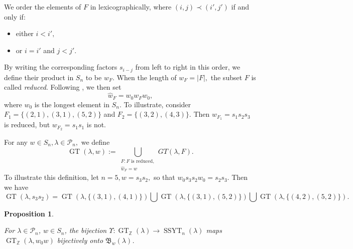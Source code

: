 \documentclass[11pt,reqno]{amsart}
\newcommand\Par{\mathscr{P}}
\newtheorem{proposition}{Proposition}
\DeclareMathOperator{\SSYT}{SSYT}
\DeclareMathOperator{\GT}{GT}
\begin{document}
We order the elements of $F$ in lexicographically, where $(i, j) \prec (i', j')$ if and only if:
\begin{itemize}
    \item either $i < i',$
    \item or $i = i'$ and $j < j'$.
\end{itemize}
By writing the corresponding factors $s_{i-j}$ from left to right in this order, we define their product in $S_n$ to be $w_F$. When the length of $w_F = |F|,$ the subset $F$ is called {\em reduced}. Following \cite[Definition 5.1]{Fujita}, we then set
$$\hat{w}_F=w_0w_Fw_0,$$ where $w_0$ is the longest element in $S_n$. To illustrate, consider $F_1=\{ (2,1),(3,1),(5,2) \}$ and $F_2=\{(3,2),(4,3)\}$. Then $w_{F_1}=s_1s_2s_3$ is reduced, but $w_{F_2} = s_1s_1$ is not. 

For any $w \in S_n, \lambda \in \Par_n,$ we define
$$\GT(\lambda,w):= \bigcup_{ \substack{F: F \text{ is reduced},\\ \hat{w}_F=w} } GT(\lambda,F).$$
To illustrate this definition, let $n=5, w=s_3s_2,$ so that $w_0s_3s_2w_0=s_2s_3$. Then we have 
$$\GT(\lambda,s_3s_2) = \GT(\lambda,\{(3,1),(4,1)\}) \bigcup \GT(\lambda,\{(3,1),(5,2)\}) \bigcup \GT(\lambda,\{(4,2),(5,2)\}).$$
\begin{proposition}
\begin{upshape}
   \cite[Corollary 5.19]{Fujita} 
\end{upshape}
For $\lambda \in \Par_n$, $ w \in S_n$, the bijection $\Upsilon: \GT_{\mathbb{Z}}(\lambda) \rightarrow \SSYT_n(\lambda)$ maps $\GT_{\mathbb{Z}}(\lambda,w_0w) $ bijectively onto $ \mathfrak{B}_{w}(\lambda)$. 
\end{proposition}
\end{document}
